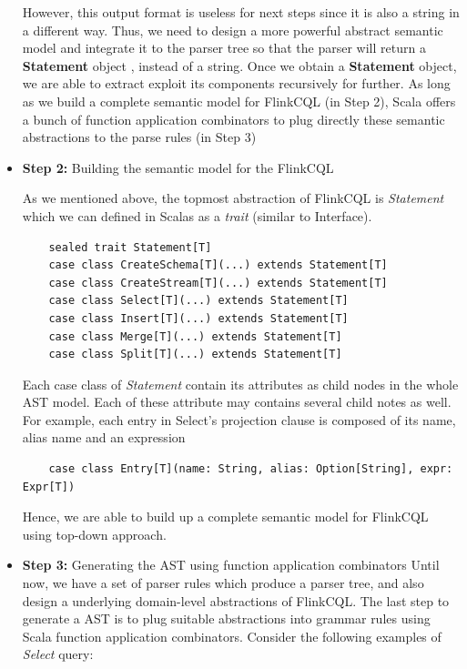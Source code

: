 \begin{itemize}
However, this output format is useless for next steps since it is also a string in a different way. Thus, we need to design a more powerful abstract semantic model and integrate it to the parser tree so that the parser will return a \textbf{Statement} object , instead of a string. Once we obtain a \textbf{Statement} object, we are able to extract  exploit its components recursively for further. As long as we build a complete semantic model for FlinkCQL (in Step 2), Scala offers a bunch of function application combinators to plug directly these semantic abstractions to the parse rules (in Step 3)

\item \textbf{Step 2:} Building the semantic model for the FlinkCQL

As we mentioned above, the topmost abstraction of FlinkCQL is \textit{Statement} which we can defined in Scalas as a \textit{trait} (similar to Interface).
\begin{lstlisting}
	sealed trait Statement[T]
	case class CreateSchema[T](...) extends Statement[T]
	case class CreateStream[T](...) extends Statement[T]
	case class Select[T](...) extends Statement[T]
	case class Insert[T](...) extends Statement[T]
	case class Merge[T](...) extends Statement[T]
	case class Split[T](...) extends Statement[T]
\end{lstlisting}

Each case class of \textit{Statement} contain its attributes as child nodes in the whole AST model. Each of these attribute may contains several child notes as well. For example, each entry in Select's projection clause is composed of its name, alias name and an expression

\begin{lstlisting}
	case class Entry[T](name: String, alias: Option[String], expr: Expr[T])
\end{lstlisting}

Hence, we are able to build up a complete semantic model for FlinkCQL using top-down approach.


\item \textbf{Step 3:} Generating the AST using function application combinators
Until now, we have a set of parser rules which produce a parser tree, and also design a underlying domain-level abstractions of FlinkCQL. The last step to generate a AST is to plug suitable abstractions into grammar rules using Scala function application combinators. Consider the following examples of \textit{Select} query:


\end{itemize}
